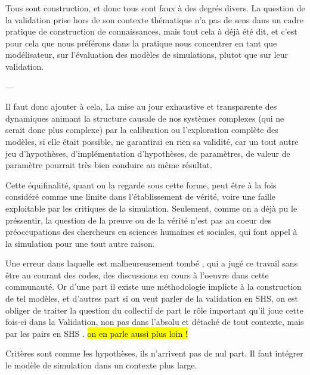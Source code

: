 Tous sont construction, et donc tous sont faux à des degrés divers. La question de la validation prise hors de son contexte thématique n'a pas de sens dans un cadre pratique de construction de connaissances, mais tout cela à déjà été dit, et c'est pour cela que nous préférons dans la pratique nous concentrer en tant que modélisateur, sur l'évaluation des modèles de simulations, plutot que sur leur validation. \autocite{Amblard2006}


---





Il faut donc ajouter à cela, La mise au jour exhaustive et transparente des dynamiques animant la structure causale de nos systèmes complexes (qui ne serait donc plus complexe) par la calibration ou l'exploration complète des modèles, si elle était possible, ne garantirai en rien sa validité, car un tout autre jeu d'hypothèses, d'implémentation d'hypothèses, de paramètres, de valeur de paramètre pourrait très bien conduire au même résultat.

Cette équifinalité, quant on la regarde sous cette forme, peut être à la fois considéré comme une limite dans l'établissement de vérité, voire une faille exploitable par les critiques de la simulation. Seulement, comme on a déjà pu le préssentir, la question de la preuve ou de la vérité n'est pas au coeur des préoccupations des chercheurs en sciences humaines et sociales, qui font appel à la simulation pour une tout autre raison. 




Une erreur dans laquelle est malheureusement tombé \textcite{Yanoff2008}, qui a jugé ce travail sans être au courant des codes, des discussions en cours à l'oeuvre dans cette communauté. Or d'une part il existe une méthodologie implicte à la construction de tel modèles, et d'autres part si on veut parler de la validation en SHS, on est obliger de traiter la question du collectif de part le rôle important qu'il joue cette fois-ci dans la Validation, non pas dans l'absolu et détaché de tout contexte, mais par les pairs en SHS . \hl{on en parle aussi plus loin ! } \autocite{}




Critères sont comme les hypothèses, ils n'arrivent pas de nul part. Il faut intégrer le modèle de simulation dans un contexte plus large.

